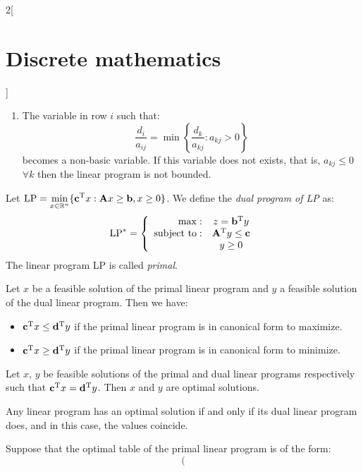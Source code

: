 \documentclass[../../../main.tex]{subfiles}
\begin{document}
\begin{multicols}{2}[\section{Discrete mathematics}]
\begin{enumerate}
        \item The variable in row $i$ such that: $$\frac{d_i}{a_{ij}}=\min\left\{\frac{d_k}{a_{kj}}:a_{kj}>0\right\}$$ becomes a non-basic variable. If this variable does not exists, that is, $a_{kj}\leq0$ $\forall k$ then the linear program is not bounded.
    \end{enumerate}
    \begin{definition}
        Let $\text{LP}=\displaystyle\min_{x\in\mathbb{R} ^n}\{\vb{c}^{\mathrm{T}}x:\vb{A}x\geq \vb{b},x\geq 0\}$. We define the \textit{dual program of LP} as: $$\text{LP}^*=\left\{
            \begin{array}{rc}
                \max:              & z=\vb{b}^{\mathrm{T}}y                 \\
                \text{subject to}: & \vb{A}^{\mathrm{T}}y\leq \vb{c} \\
                                   & y\geq 0
            \end{array}\right.$$ The linear program LP is called \textit{primal}.
    \end{definition}
    \begin{theorem}
        Let $x$ be a feasible solution of the primal linear program and $y$ a feasible solution of the dual linear program. Then we have:
        \begin{itemize}
            \item $\vb{c}^{\mathrm{T}}x\leq \vb{d}^{\mathrm{T}}y$ if the primal linear program is in canonical form to maximize.
            \item $\vb{c}^{\mathrm{T}}x\geq \vb{d}^{\mathrm{T}}y$ if the primal linear program is in canonical form to minimize.
        \end{itemize}
    \end{theorem}
    \begin{corollary}
        Let $x$, $y$ be feasible solutions of the primal and dual linear programs respectively such that $\vb{c}^{\mathrm{T}}x=\vb{d}^{\mathrm{T}}y$. Then $x$ and $y$ are optimal solutions.
    \end{corollary}
    \begin{theorem}
        Any linear program has an optimal solution if and only if its dual linear program does, and in this case, the values coincide.
    \end{theorem}
    \begin{theorem}
        Suppose that the optimal table of the primal linear program is of the form:
        $$\left(
$$
\end{theorem}
\end{multicols}
\end{document}
